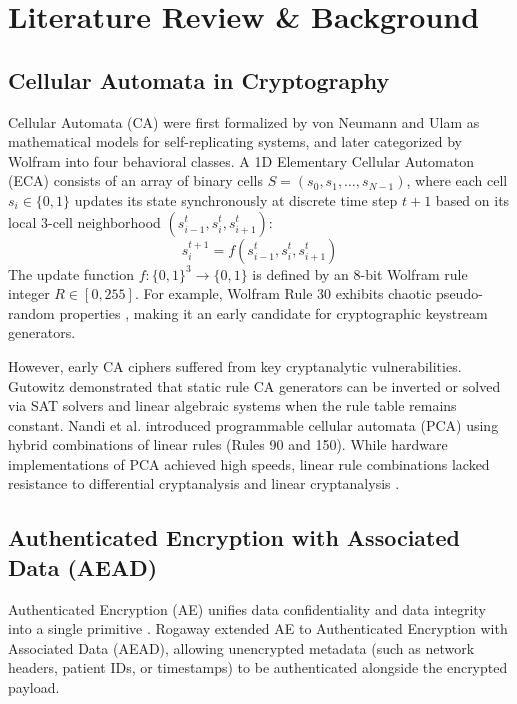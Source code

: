 \section{Literature Review \& Background}
\label{sec:literature_review}

\subsection{Cellular Automata in Cryptography}
\label{subsec:ca_background}
Cellular Automata (CA) were first formalized by von Neumann and Ulam as mathematical models for self-replicating systems, and later categorized by Wolfram \cite{wolfram1983statistical} into four behavioral classes. A 1D Elementary Cellular Automaton (ECA) consists of an array of binary cells $S = (s_0, s_1, \dots, s_{N-1})$, where each cell $s_i \in \{0, 1\}$ updates its state synchronously at discrete time step $t+1$ based on its local 3-cell neighborhood $(s_{i-1}^t, s_i^t, s_{i+1}^t)$:
\begin{equation}
s_i^{t+1} = f(s_{i-1}^t, s_i^t, s_{i+1}^t)
\label{eq:eca_local_rule}
\end{equation}
The update function $f: \{0,1\}^3 \to \{0,1\}$ is defined by an 8-bit Wolfram rule integer $R \in [0, 255]$. For example, Wolfram Rule 30 exhibits chaotic pseudo-random properties \cite{wolfram1986random}, making it an early candidate for cryptographic keystream generators.

However, early CA ciphers suffered from key cryptanalytic vulnerabilities. Gutowitz \cite{gutowitz1993cryptology} demonstrated that static rule CA generators can be inverted or solved via SAT solvers and linear algebraic systems when the rule table remains constant. Nandi et al. \cite{nandi2002theory} introduced programmable cellular automata (PCA) using hybrid combinations of linear rules (Rules 90 and 150). While hardware implementations of PCA achieved high speeds, linear rule combinations lacked resistance to differential cryptanalysis \cite{biham1991differential} and linear cryptanalysis \cite{matsui1993linear}.

\subsection{Authenticated Encryption with Associated Data (AEAD)}
\label{subsec:aead_background}
Authenticated Encryption (AE) unifies data confidentiality and data integrity into a single primitive \cite{bellare2000authenticated}. Rogaway \cite{rogaway2002authenticated} extended AE to Authenticated Encryption with Associated Data (AEAD), allowing unencrypted metadata (such as network headers, patient IDs, or timestamps) to be authenticated alongside the encrypted payload.

